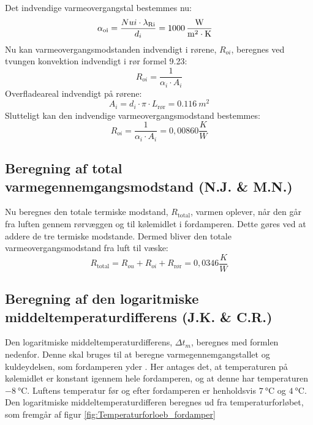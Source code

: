 \documentclass[../Hovedrapport.tex]{subfiles}
\begin{document}
Det indvendige varmeovergangstal bestemmes nu: 
\begin{align}
\alpha_\text{oi} &= \frac{{Nui} \cdot \si{\lambda_{Ri}}}{d_{i}} = \SI{1000}{\frac{\watt}{m^2 \cdot K}}
\end{align}
Nu kan varmeovergangsmodstanden indvendigt i rørene, $R_{oi}$, beregnes ved tvungen konvektion indvendigt i rør \citep{termo} formel 9.23:
\begin{equation}
R_{oi} = \frac {1}{\alpha_{i} \cdot  A_{i}} 
\end{equation}
Overfladeareal indvendigt på rørene:
\begin{equation}
A_{i} = d_{i} \cdot  \pi \cdot  L_{\text{rør}} = \SI{0,116}{m^2}
\end{equation}
Slutteligt kan den indvendige varmeovergangsmodstand bestemmes:
\begin{equation}
R_{oi} = \frac {1}{\alpha_{i} \cdot  A_{i}} = \si{0,00860}{\frac{K}{W}}
\end{equation}

\subsection{Beregning af total varmegennemgangsmodstand  (N.J. \& M.N.)}
    \label{sec:VarmeledningsmodstandF}
Nu beregnes den totale termiske modstand, $R_\text{total}$, varmen oplever, når den går fra luften gennem rørvæggen og til kølemidlet i fordamperen. Dette gøres ved at addere de tre termiske modstande. Dermed bliver den totale varmeovergangsmodstand fra luft til væske:
\begin{equation}
R_\text{total} = R_{ou} + R_{oi} + R_\text{rør} = \si{0,0346}{\frac{K}{W}} 	
\end{equation}
\subsection{Beregning af den logaritmiske middeltemperaturdifferens  (J.K. \& C.R.)}
    \label{sec:Massestrøm af kølemiddel}
Den logaritmiske middeltemperaturdifferens, $\si{\Delta{t_m}}$, beregnes med formlen nedenfor. Denne skal bruges til at beregne varmegennemgangstallet og kuldeydelsen, som fordamperen yder \citep{koleteknik}. Her antages det, at temperaturen på kølemidlet er konstant igennem hele fordamperen, og at denne har temperaturen $\SI{-8}{\celsius}$. Luftens temperatur før og efter fordamperen er henholdsvis $\SI{7}{\celsius}$ og $\SI{4}{\celsius}$. Den logaritmiske middeltemperaturdifferen beregnes ud fra temperaturforløbet, som fremgår af figur \ref{fig:Temperaturforloeb_fordamper} 
\end{document}
